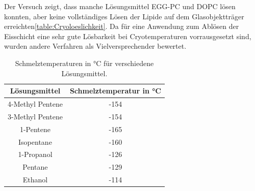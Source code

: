 Der Versuch zeigt, dass manche Lösungsmittel EGG-PC und DOPC lösen konnten, aber keine vollständiges Lösen der Lipide auf dem Glasobjektträger erreichten\ref{table:Cryoloeslichkeit}. Da für eine Anwendung zum Ablösen der Eisschicht eine sehr gute Lösbarkeit bei Cryotemperaturen vorrausgesetzt sind, wurden andere Verfahren als Vielversprechender bewertet. 

\begin{table}[h]
	\centering
	\begin{tabular}{|c|c|}
		\hline
		Lösungsmittel & Schmelztemperatur in °C \\
		\hline
		\hline
		4-Methyl Pentene & -154 \\ 
		\hline
		3-Methyl Pentene & -154 \\
		\hline
		1-Pentene & -165 \\
		\hline
		Isopentane & -160 \\
		\hline
		1-Propanol & -126 \\
		\hline
		Pentane & -129 \\
		\hline
		Ethanol & -114 \\
		\hline
	\end{tabular}
	\caption{Schmelztemperaturen in °C für verschiedene Lösungsmittel.}
	\label{table:SchmelztemperaturLösungsmittel}
\end{table}

